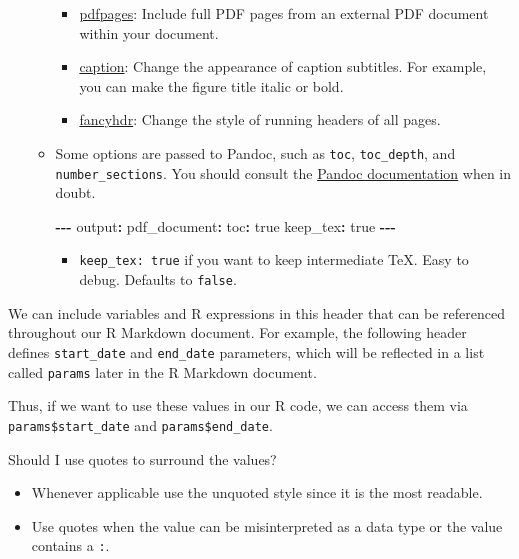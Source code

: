 \documentclass[
]{book}
\newenvironment{Shaded}{\begin{snugshade}}{\end{snugshade}}
\newcommand{\NormalTok}[1]{#1}
\newcommand{\SpecialCharTok}[1]{\textcolor[rgb]{0.81,0.36,0.00}{\textbf{#1}}}
\providecommand{\tightlist}{%
  \setlength{\itemsep}{0pt}\setlength{\parskip}{0pt}}
\begin{document}
\begin{itemize}
\begin{itemize}
    \begin{itemize}
    \tightlist
    \item
      \href{https://ctan.org/pkg/pdfpages}{pdfpages}: Include full PDF pages from an external PDF document within your document.
    \item
      \href{https://ctan.org/pkg/caption}{caption}: Change the appearance of caption subtitles. For example, you can make the figure title italic or bold.
    \item
      \href{https://ctan.org/pkg/fancyhdr}{fancyhdr}: Change the style of running headers of all pages.
    \end{itemize}
  \item
    Some options are passed to Pandoc, such as \texttt{toc}, \texttt{toc\_depth}, and \texttt{number\_sections}. You should consult the \href{https://pandoc.org/MANUAL.html\#variables}{Pandoc documentation} when in doubt.

\begin{Shaded}
\begin{Highlighting}[]
\SpecialCharTok{{-}{-}{-}}
\NormalTok{output}\SpecialCharTok{:}
\NormalTok{  pdf\_document}\SpecialCharTok{:}
\NormalTok{    toc}\SpecialCharTok{:}\NormalTok{ true}
\NormalTok{        keep\_tex}\SpecialCharTok{:}\NormalTok{ true}
\SpecialCharTok{{-}{-}{-}}
\end{Highlighting}
\end{Shaded}

    \begin{itemize}
    \tightlist
    \item
      \texttt{keep\_tex:\ true} if you want to keep intermediate TeX. Easy to debug. Defaults to \texttt{false}.
    \end{itemize}
  \end{itemize}
\end{itemize}

We can include variables and R expressions in this header that can be referenced throughout our R Markdown document. For example, the following header defines \texttt{start\_date} and \texttt{end\_date} parameters, which will be reflected in a list called \texttt{params} later in the R Markdown document.

Thus, if we want to use these values in our R code, we can access them via \texttt{params\$start\_date} and \texttt{params\$end\_date}.

Should I use quotes to surround the values?

\begin{itemize}
\tightlist
\item
  Whenever applicable use the unquoted style since it is the most readable.
\item
  Use quotes when the value can be misinterpreted as a data type or the value contains a \texttt{:}.
\end{itemize}
\end{document}
